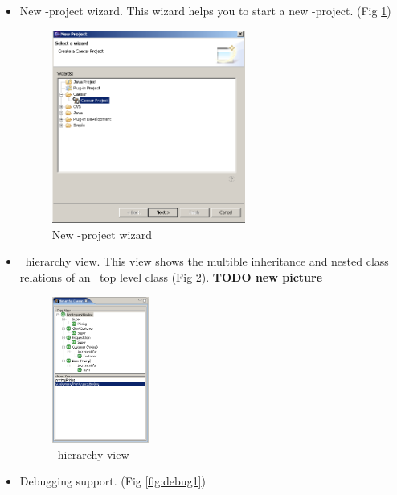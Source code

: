 \begin{itemize}
  \item New \caesarj -project wizard. This wizard helps you to start a new \caesarj -project. (Fig \ref{fig:projectwizard})
  
\begin{figure}[htbp]
	\centering
		\includegraphics[width=0.60\textwidth]{images/project_wizard.png}
	\caption{New \caesarj -project wizard}
	\label{fig:projectwizard}
\end{figure} 
     
  \item \caesarj ~hierarchy view. This view shows the multible inheritance and nested class relations of an \caesarj ~top level class (Fig \ref{fig:hierarchy}). \textbf{TODO new picture}
  
\begin{figure}[htbp]
	\centering
		\includegraphics[width=0.30\textwidth]{images/hierarchy.png}
	\caption{\caesarj ~hierarchy view}
	\label{fig:hierarchy}
\end{figure} 

  \item Debugging support. (Fig \ref{fig:debug1})
  

\end{itemize}
